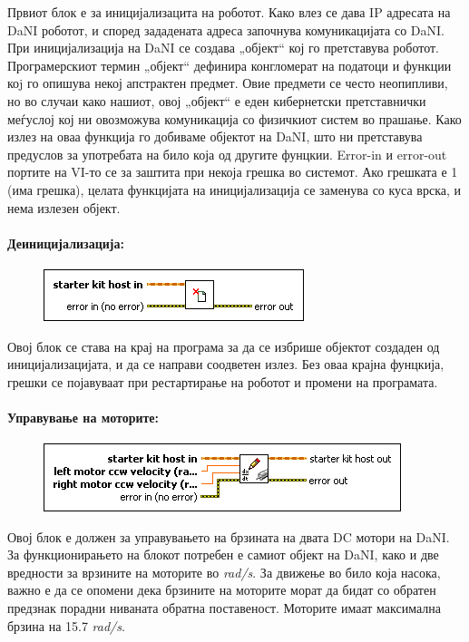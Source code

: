 \documentclass{article}
\begin{document}
Првиот блок е за иницијализацита на роботот. Како влез се дава IP адресата на DaNI роботот, и според зададената адреса започнува комуникацијата со DaNI. При иницијализација на DaNI се создава „објект“ кој го претставува роботот. Програмерскиот термин „објект“ дефинира конгломерат на податоци и функции коj го опишува некој апстрактен предмет. Овие предмети се често неопипливи, но во случаи како нашиот, овој „објект“ е еден кибернетски претставнички меѓуслој кој ни овозможува комуникација со физичкиот систем во прашање. Како излез на оваа функција го добиваме објектот на DaNI, што ни претставува предуслов за употребата на било која од другите фунцкии. Error-in и error-out портите на VI-то се за заштита при некоја грешка во системот. Ако грешката е 1 (има грешка), целата функцијата на иницијализација се заменува со куса врска, и нема излезен објект. \\

\paragraph{Деиницијализација:\\}
\begin{figure}[h]  
\includegraphics[width = 0.45\linewidth]{deinit.png}
\raggedright
\end{figure}
Овој блок се става на крај на програма за да се избрише објектот создаден од иницијализацијата, и да се направи соодветен излез. Без оваа крајна фунцкија, грешки се појавуваат при рестартирање на роботот и промени на програмата. 
\\

\paragraph{Управување на моторите:\\}
\begin{figure}[h]
\includegraphics[width=0.45\linewidth]{write_dc.png}
\raggedright
\end{figure}

Овој блок е должен за управувањето на брзината на двата DC мотори на DaNI. За функционирањето на блокот потребен е самиот објект на DaNI, како и две вредности за врзините на моторите во \textit{rad/s}. За движење во било која насока, важно е да се опомени дека брзините на моторите морат да бидат со обратен предзнак порадни ниваната обратна поставеност. Моторите имаат максимална брзина на 15.7 \textit{rad/s}.
\end{document}
